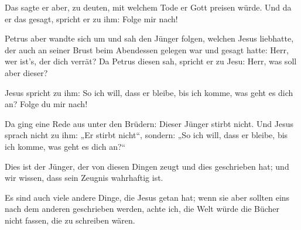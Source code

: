  Das sagte er aber, zu deuten, mit welchem Tode er Gott
preisen würde. Und da er das gesagt, spricht er zu ihm: Folge mir nach!

 Petrus aber wandte sich um und sah den Jünger folgen,
welchen Jesus liebhatte, der auch an seiner Brust beim Abendessen
gelegen war und gesagt hatte: Herr, wer ist's, der dich verrät?
 Da Petrus diesen sah, spricht er zu Jesu: Herr, was soll
aber dieser?

 Jesus spricht zu ihm: So ich will, dass er bleibe, bis
ich komme, was geht es dich an? Folge du mir nach!

 Da ging eine Rede aus unter den Brüdern: Dieser Jünger
stirbt nicht. Und Jesus sprach nicht zu ihm: „Er stirbt nicht``,
sondern: „So ich will, dass er bleibe, bis ich komme, was geht es dich
an?{}``

 Dies ist der Jünger, der von diesen Dingen zeugt und
dies geschrieben hat; und wir wissen, dass sein Zeugnis wahrhaftig ist.

 Es sind auch viele andere Dinge, die Jesus getan hat;
wenn sie aber sollten eins nach dem anderen geschrieben werden, achte
ich, die Welt würde die Bücher nicht fassen, die zu schreiben wären.
